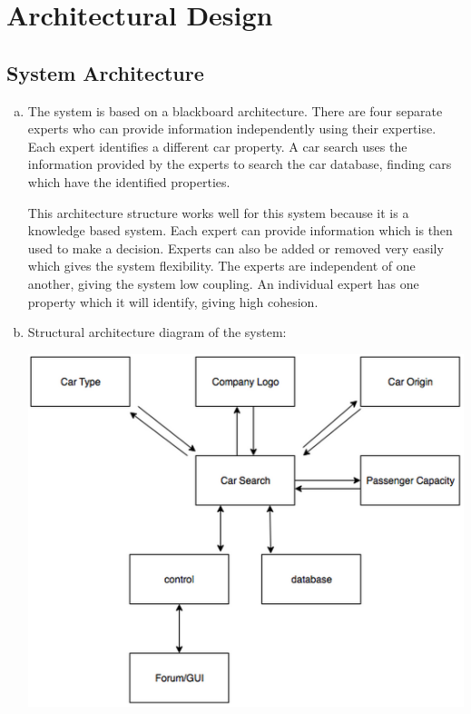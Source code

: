 \documentclass[12pt]{article}
\begin{document}
\section{Architectural Design}
\label{sec:architectural_design}

\subsection{System Architecture}
\label{sub:system_architecture}
\begin{enumerate}[a)]
	\item The system is based on a blackboard architecture. There are four separate experts who can provide information independently using their expertise. Each expert identifies a different car property. A car search uses the information provided by the experts to search the car database, finding cars which have the identified properties.
	\par
	This architecture structure works well for this system because it is a knowledge based system. Each expert can provide information which is then used to make a decision. Experts can also be added or removed very easily which gives the system flexibility. The experts are independent of one another, giving the system low coupling. An individual expert has one property which it will identify, giving high cohesion.
	\item Structural architecture diagram of the system:
	\par
	\includegraphics[width=\textwidth]{Structural.png}
\end{enumerate}
\end{document}

